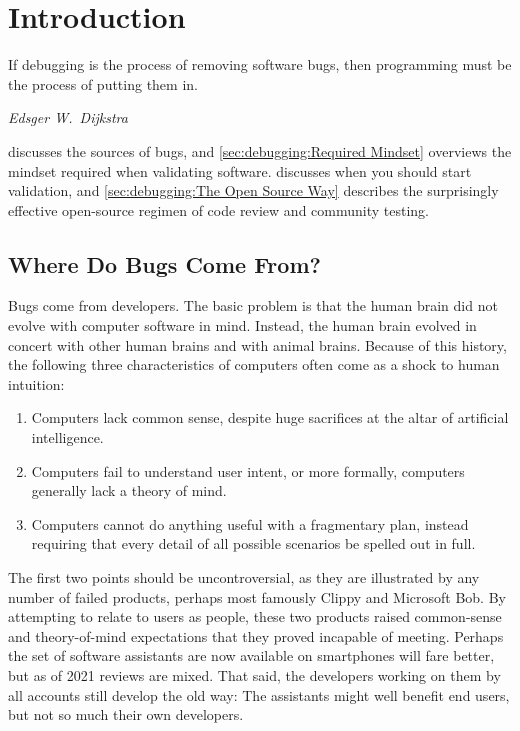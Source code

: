 \section{Introduction}
\label{sec:debugging:Introduction}
%
\epigraph{If debugging is the process of removing software bugs, then
	  programming must be the process of putting them in.}
	 {\emph{Edsger W.~Dijkstra}}

discusses the sources of bugs, and
\cref{sec:debugging:Required Mindset}
overviews the mindset required when validating software.
discusses when you should start validation, and
\cref{sec:debugging:The Open Source Way} describes the
surprisingly effective open-source regimen of code review and
community testing.

\subsection{Where Do Bugs Come From?}
\label{sec:debugging:Where Do Bugs Come From?}

Bugs come from developers.
The basic problem is that the human brain did not evolve with computer
software in mind.
Instead, the human brain evolved in concert with other human brains and
with animal brains.
Because of this history, the following three characteristics of computers
often come as a shock to human intuition:

\begin{enumerate}
\item	Computers lack common sense, despite huge sacrifices at the
	altar of artificial intelligence.
\item	Computers fail to understand user intent, or more formally,
	computers generally lack a theory of mind.
\item	Computers cannot do anything useful with a fragmentary plan,
	instead requiring that every detail of all possible scenarios
	be spelled out in full.
\end{enumerate}

The first two points should be uncontroversial, as they are illustrated
by any number of failed products, perhaps most famously Clippy and
Microsoft Bob.
By attempting to relate to users as people, these two products raised
common-sense and theory-of-mind expectations that they proved incapable
of meeting.
Perhaps the set of software assistants are now available on smartphones
will fare better, but as of 2021 reviews are mixed.
That said, the developers working on them by all accounts still develop
the old way: The assistants might well benefit end users, but not so
much their own developers.

